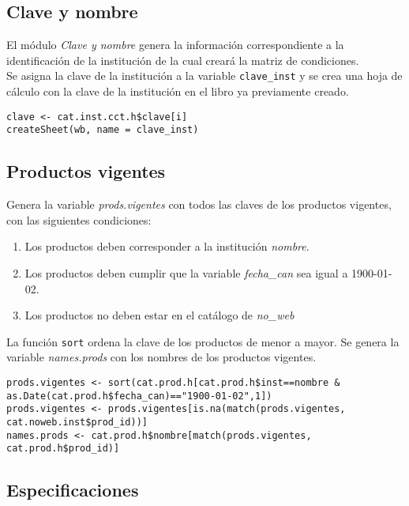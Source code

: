 \documentclass{report}
\begin{document}
\subsection{Clave y nombre}
El módulo \textit{Clave y nombre} genera la información correspondiente a la identificación de la institución de la cual creará la matriz de condiciones.\\ Se asigna la clave de la institución a la variable \texttt{clave\_inst} y se crea una hoja de cálculo con la clave de la institución en el libro ya previamente creado.

\begin{flushleft}
    \texttt{clave <- cat.inst.cct.h\$clave[i]} \\
    \texttt{createSheet(wb, name = clave\_inst)}
\end{flushleft}

\subsection{Productos vigentes}
Genera la variable \textit{prods.vigentes} con todos las claves de los productos vigentes, con las siguientes condiciones:
\begin{enumerate}
    \item Los productos deben corresponder a la institución \textit{nombre}.
    \item Los productos deben cumplir que la variable \textit{fecha\_can} sea igual a 1900-01-02.
    \item Los productos no deben estar en el catálogo de \textit{no\_web}
\end{enumerate}
La función \texttt{sort} ordena la clave de los productos de menor a mayor. Se genera la variable \textit{names.prods} con los nombres de los productos vigentes.
\begin{flushleft}
    \texttt{prods.vigentes <- sort(cat.prod.h[cat.prod.h\$inst==nombre \& as.Date(cat.prod.h\$fecha\_can)=="1900-01-02",1])} \\
    \texttt{prods.vigentes <- prods.vigentes[is.na(match(prods.vigentes, cat.noweb.inst\$prod\_id))]} \\
    \texttt{names.prods <- cat.prod.h\$nombre[match(prods.vigentes, cat.prod.h\$prod\_id)]} \\
\end{flushleft}

\subsection{Especificaciones}
\end{document}
